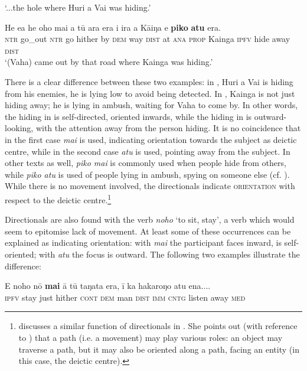 \glt 
‘...the hole where Huri a Vai was hiding.’ \textstyleExampleref{[R304.044]} 
\z

\ea\label{ex:7.144}
\gll He e{\ꞌ}a he oho mai a tū ara era {\ꞌ}i ira a Kāiŋa e \textbf{piko} \textbf{atu} era. \\
\textsc{ntr} go\_out \textsc{ntr} go hither by \textsc{dem} way \textsc{dist} at \textsc{ana} \textsc{prop} Kainga \textsc{ipfv} hide away \textsc{dist} \\

\glt
‘(Vaha) came out by that road where Kainga was hiding.’ \textstyleExampleref{[R304.094]} 
\z

There is a clear difference between these two examples: in , Huri a Vai is hiding from his enemies, he is lying low to avoid being detected. In , Kainga is not just hiding away; he is lying in ambush, waiting for Vaha to come by. In other words, the hiding in  is self-directed, oriented inwards, while the hiding in  is outward-looking, with the attention away from the person hiding. It is no coincidence that in the first case \textit{mai} is used, indicating orientation towards the subject as deictic centre, while in the second case \textit{atu} is used, pointing away from the subject. In other texts as well, \textit{piko mai} is commonly used when people hide from others, while \textit{piko atu} is used of people lying in ambush, spying on someone else (cf. \citealt[12]{Fuller1980}). While there is no movement involved, the directionals indicate \textsc{orientation} with respect to the deictic centre.\footnote{\label{fn:357}\citet[1751]{Hooper2004} discusses a similar function of directionals in . She points out (with reference to \citealt{Jackendoff1983}) that a path (i.e. a  movement) may play various roles: an object may traverse a path, but it may also be oriented along a path, facing an entity (in this case, the deictic centre).} 

Directionals are also found with the verb \textit{noho} ‘to sit, stay’, a verb which would seem to epitomise lack of movement. At least some of these occurrences can be explained as indicating orientation: with \textit{mai} the participant faces inward, is self-oriented; with \textit{atu} the focus is outward. The following two examples illustrate the difference:

\ea\label{ex:7.145}
\gll E noho nō \textbf{mai} {\ꞌ}ā tū taŋata era, {\ꞌ}ī ka hakaroŋo atu ena....\\
\textsc{ipfv} stay just hither \textsc{cont} \textsc{dem} man \textsc{dist} \textsc{imm} \textsc{cntg} listen away \textsc{med}\\

